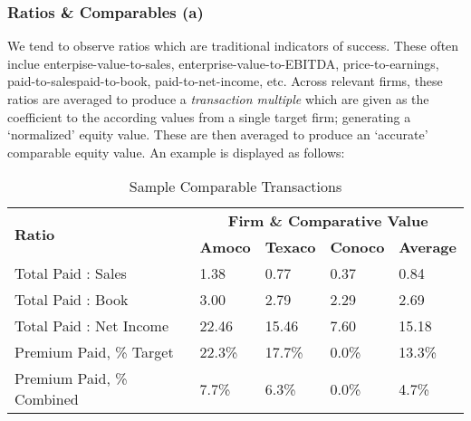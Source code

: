 \documentclass[11pt, english]{article}
\begin{document}
                \subsubsection*{Ratios \& Comparables (a)}
        
        We tend to observe ratios which are traditional indicators of success. These often inclue enterpise-value-to-sales, enterprise-value-to-EBITDA, price-to-earnings, paid-to-salespaid-to-book, paid-to-net-income, etc. Across relevant firms, these ratios are averaged to produce a \textit{transaction multiple} which are given as the coefficient to the according values from a single target firm; generating a `normalized' equity value. These are then averaged to produce an `accurate' comparable equity value. An example is displayed as follows:

	\begin{table}[h]
                \scriptsize
                \renewcommand{\arraystretch}{1.25}
        \begin{center}
        \begin{tabular}{p{4cm}|p{2cm}p{2cm}p{2cm}|p{2cm}}
                \multirow{2}{*}{\textbf{Ratio}} & \multicolumn{4}{c}{\textbf{Firm \& Comparative Value}}\\
                \cline{2-5}
                & \textbf{Amoco} & \textbf{Texaco} & \textbf{Conoco} & \textbf{Average}\\
                \hline
                Total Paid : Sales & 1.38 & 0.77 & 0.37 & 0.84\\
                Total Paid : Book & 3.00 & 2.79 & 2.29 & 2.69\\
                Total Paid : Net Income & 22.46 & 15.46 & 7.60 & 15.18\\
                Premium Paid, \% Target & 22.3\% & 17.7\% & 0.0\% & 13.3\%\\
                Premium Paid, \% Combined & 7.7\% & 6.3\% & 0.0\% & 4.7\%\\
                \hline
        \end{tabular}
                \caption{Sample Comparable Transactions}
        \end{center}
        \end{table}
\end{document}
